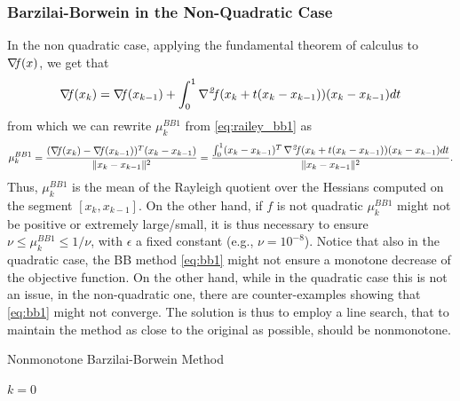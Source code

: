 \documentclass[10pt,a4paper]{article}
\begin{document}
\subsubsection{Barzilai-Borwein in the Non-Quadratic Case}
In the non quadratic case, applying the fundamental theorem of calculus to $\operatorname*{\mathit{\nabla \!f}}(x)$, we get that
\begin{equation*}
\operatorname*{\mathit{\nabla \!f}}(x_k)=\operatorname*{\mathit{\nabla \!f}}(x_{k-1}) + \int_{0}^{1} \operatorname*{\mathit{\nabla^2 \!f}}(x_k+t(x_k-x_{k-1})) (x_k-x_{k-1}) dt
\end{equation*} 
from which we can rewrite $\mu_k^{BB1}$ from \eqref{eq:railey_bb1} as
\begin{equation*}
	\mu_k^{BB1} = \frac{(\operatorname*{\mathit{\nabla \!f}}(x_k)-\operatorname*{\mathit{\nabla \!f}}(x_{k-1}))^T(x_k-x_{k-1})}{\|x_k - x_{k-1}\|^2} = \frac{\int_{0}^{1}(x_k-x_{k-1})^T \operatorname*{\mathit{\nabla^2 \!f}}(x_k+t(x_k-x_{k-1})) (x_k-x_{k-1}) dt }{\|x_k - x_{k-1}\|^2}.
\end{equation*}
Thus, $\mu_k^{BB1}$ is the mean of the Rayleigh quotient over the Hessians computed on the segment $[x_k, x_{k-1}]$. On the other hand, if $f$ is not quadratic $\mu_k^{BB1}$ might not be positive or extremely large/small, it is thus necessary to ensure $\nu\leq \mu_k^{BB1}\leq 1/\nu$, with $\epsilon$ a fixed constant (e.g., $\nu=10^{-8}$). Notice that also in the quadratic case, the BB method \eqref{eq:bb1} might not ensure a monotone decrease of the objective function. On the other hand, while in the quadratic case this is not an issue, in the non-quadratic one, there are counter-examples showing that \eqref{eq:bb1} might not converge. The solution is thus to employ a line search, that to maintain the method as close to the original as possible, should be nonmonotone. 
\begin{algorithm}[H]\label{alg:bb}
	\caption{Nonmonotone Barzilai-Borwein Method}
	
	
	$k = 0$
	
\end{algorithm}






\end{document}
